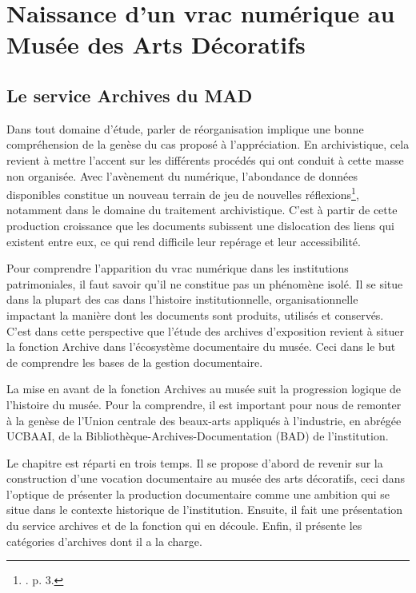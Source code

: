 \part{Naissance d’un vrac numérique au Musée des Arts Décoratifs}

\chapter{Le service Archives du MAD}

Dans tout domaine d’étude, parler de réorganisation implique une bonne compréhension de la genèse du cas proposé à l’appréciation. En archivistique, cela revient à mettre l’accent sur les différents procédés qui ont conduit à cette masse non organisée. Avec l’avènement du numérique, l’abondance de données disponibles constitue un nouveau terrain de jeu de nouvelles réflexions\footnote{\cite{bermes-charpier-stutzmann-2026}. p. 3.}, notamment dans le domaine du traitement archivistique. C’est à partir de cette production croissance que les documents subissent une dislocation des liens qui existent entre eux, ce qui rend difficile leur repérage et leur accessibilité.

Pour comprendre l’apparition du vrac numérique dans les institutions patrimoniales, il faut savoir qu’il ne constitue pas un phénomène isolé. Il se situe dans la plupart des cas dans l’histoire institutionnelle, organisationnelle impactant la manière dont les documents sont produits, utilisés et conservés. C’est dans cette perspective que l’étude des archives d’exposition revient à situer la fonction Archive dans l’écosystème documentaire du musée. Ceci dans le but de comprendre les bases de la gestion documentaire. 

La mise en avant de la fonction Archives au musée suit la progression logique de l’histoire du musée. Pour la comprendre, il est important pour nous de remonter à la genèse de l’Union centrale des beaux-arts appliqués à l’industrie, en abrégée UCBAAI, de la Bibliothèque-Archives-Documentation (BAD) de l’institution.

Le chapitre est réparti en trois temps. Il se propose d’abord de revenir sur la construction d’une vocation documentaire au musée des arts décoratifs, ceci dans l’optique de présenter la production documentaire comme une ambition qui se situe dans le contexte historique de l’institution. Ensuite, il fait une présentation du service archives et de la fonction qui en découle. Enfin, il présente les catégories d’archives dont il a la charge.


